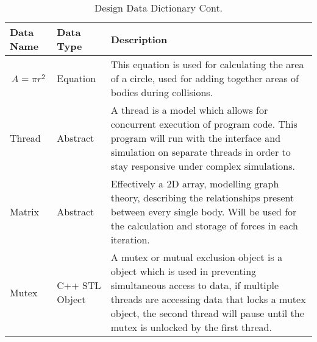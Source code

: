 \begin{table}[H]
\caption{Design Data Dictionary Cont.}
\centering
\footnotesize
\def\arraystretch{1.5}
\begin{tabular}{|M{3cm}|M{3cm}|m{8cm}|}
\hline 
\textbf{Data Name} & \textbf{Data Type} & \textbf{Description} \\ \hline
$$A=\pi{r^2}$$ & Equation & This equation is used for calculating the area of a circle, used for adding together areas of bodies during collisions. \\ \hline
Thread & Abstract & A thread is a model which allows for concurrent execution of program code. This program will run with the interface and simulation on separate threads in order to stay responsive under complex simulations. \\ \hline
Matrix & Abstract & Effectively a 2D array, modelling graph theory, describing the relationships present between every single body. Will be used for the calculation and storage of forces in each iteration. \\ \hline
Mutex & C++ STL Object & A mutex or mutual exclusion object is a object which is used in preventing simultaneous access to data, if multiple threads are accessing data that locks a mutex object, the second thread will pause until the mutex is unlocked by the first thread. \\ \hline
\end{tabular}
\end{table} 